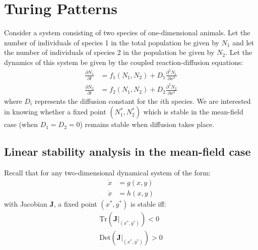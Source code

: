 \chapter{Turing Patterns}\label{chap_Turing}

Consider a system consisting of two species of one-dimensional animals. Let the number of individuals of species 1 in the total population be given by $N_1$ and let the number of individuals of species 2 in the population be given by $N_2$. Let the dynamics of this system be given by the coupled reaction-diffusion equations:
\begin{equation}
	\label{sys_dyn}
	\begin{aligned}
		\frac{\partial N_1}{\partial t} &= f_{1}(N_1,N_2) + D_{1}\frac{\partial^2 N_{1}}{\partial x^2}\\
		\frac{\partial N_2}{\partial t} &= f_{2}(N_1,N_2) + D_{2}\frac{\partial^2 N_{2}}{\partial x^2}
	\end{aligned}
\end{equation}
where $D_i$ represents the diffusion constant for the $i$th species. We are interested in knowing whether a fixed point $(N_{1}^{*},N_{2}^{*})$ which is stable in the mean-field case (when $D_1 = D_2 = 0$) remains stable when diffusion takes place.
\bigskip
\section{Linear stability analysis in the mean-field case}
Recall that for any two-dimensional dynamical system of the form:
\begin{align*}
	\dot{x} &= g(x,y)\\
	\dot{x} &= h(x,y)
\end{align*}
with Jacobian $\mathbf{J}$, a fixed point $(x^*,y^*)$ is stable iff:
\begin{align*}
	\mathrm{Tr}(\left.\mathbf{J}\right\vert_{(x^*,y^*)}) < 0\\
	\mathrm{Det}(\left.\mathbf{J}\right\vert_{(x^*,y^*)}) > 0
\end{align*}

